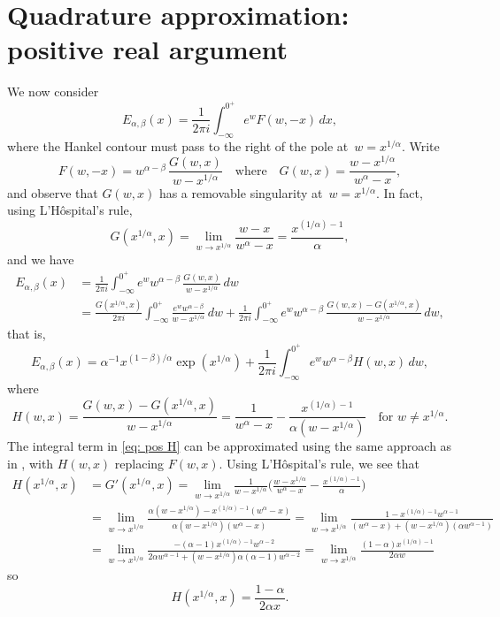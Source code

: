 \documentclass[12pt,a4paper]{article}
\begin{document}
\section{Quadrature approximation: positive real argument}
We now consider
\[
E_{\alpha,\beta}(x)=\frac{1}{2\pi i}\int_{-\infty}^{0^+}
    e^wF(w,-x)\,dx,
\]
where the Hankel contour must pass to the right of the pole at~$w=x^{1/\alpha}$.
Write
\[
F(w,-x)=w^{\alpha-\beta}\,\frac{G(w,x)}{w-x^{1/\alpha}}\quad\text{where}\quad
G(w,x)=\frac{w-x^{1/\alpha}}{w^\alpha-x},
\]
and observe that $G(w,x)$ has a removable singularity at~$w=x^{1/\alpha}$. In 
fact, using L'H\^ospital's rule,
\[
G(x^{1/\alpha},x)=\lim_{w\to x^{1/\alpha}}
    \frac{w-x}{w^\alpha-x}=\frac{x^{(1/\alpha)-1}}{\alpha},
\]
and we have
\begin{align*}
E_{\alpha,\beta}(x)&=\frac{1}{2\pi i}\int_{-\infty}^{0^+}e^w w^{\alpha-\beta}\,
    \frac{G(w,x)}{w-x^{1/\alpha}}\,dw\\
    &=\frac{G(x^{1/\alpha},x)}{2\pi i}\int_{-\infty}^{0^+}
    \frac{e^w w^{\alpha-\beta}}{w-x^{1/\alpha}}\,dw
    +\frac{1}{2\pi i}\int_{-\infty}^{0^+}e^ww^{\alpha-\beta}\,
    \frac{G(w,x)-G(x^{1/\alpha},x)}{w-x^{1/\alpha}}\,dw,
\end{align*}
that is,
\begin{equation}\label{eq: pos H}
E_{\alpha,\beta}(x)=\alpha^{-1}x^{(1-\beta)/\alpha}\exp(x^{1/\alpha})
    +\frac{1}{2\pi i}\int_{-\infty}^{0^+}e^w w^{\alpha-\beta} H(w,x)\,dw,
\end{equation}
where
\[
H(w,x)=\frac{G(w,x)-G(x^{1/\alpha},x)}{w-x^{1/\alpha}}
    =\frac{1}{w^\alpha-x}-\frac{x^{(1/\alpha)-1}}{\alpha (w-x^{1/\alpha})}
\quad\text{for $w\ne x^{1/\alpha}$.}
\]
The integral term in \eqref{eq: pos H} can be approximated using the same 
approach as in , with $H(w,x)$ replacing $F(w,x)$.
Using L'H\^ospital's rule, we see that
\begin{align*}
H(x^{1/\alpha},x)&=G'(x^{1/\alpha},x)
    =\lim_{w\to x^{1/\alpha}}\frac{1}{w-x^{1/\alpha}}\biggl(
    \frac{w-x^{1/\alpha}}{w^\alpha-x}-\frac{x^{(1/\alpha)-1}}{\alpha}\biggr)\\
&=\lim_{w\to x^{1/\alpha}}
\frac{\alpha(w-x^{1/\alpha})-x^{(1/\alpha)-1}(w^\alpha-x)}%
{\alpha(w-x^{1/\alpha})(w^\alpha-x)}
=\lim_{w\to x^{1/\alpha}}\frac{1-x^{(1/\alpha)-1}w^{\alpha-1}}%
{(w^\alpha-x)+(w-x^{1/\alpha})(\alpha w^{\alpha-1})}\\
&=\lim_{w\to x^{1/\alpha}}\frac{-(\alpha-1)x^{(1/\alpha)-1}w^{\alpha-2}}%
{2\alpha w^{\alpha-1}+(w-x^{1/\alpha})\alpha(\alpha-1)w^{\alpha-2}}
=\lim_{w\to x^{1/\alpha}}\frac{(1-\alpha)x^{(1/\alpha)-1}}{2\alpha w}
\end{align*}
so
\[
H(x^{1/\alpha},x)=\frac{1-\alpha}{2\alpha x}.
\]
\end{document}
